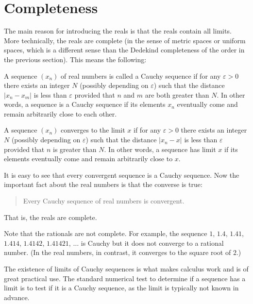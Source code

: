 \documentclass{article}
\begin{document}
\section{Completeness}

The main reason for introducing the reals is that the reals contain all limits.
More technically, the reals are complete (in the sense of metric spaces or
uniform spaces, which is a different sense than the Dedekind completeness of
the order in the previous section). This means the following:
                                                                                
A sequence $(x_n)$ of real numbers is called a Cauchy sequence if for any
$\varepsilon > 0$
there exists an integer $N$ (possibly depending on $\varepsilon$) such that the
distance $|x_n - x_m|$ is less than $\varepsilon$ provided that $n$ and $m$ are
both greater than $N$. In other
words, a sequence is a Cauchy sequence if its elements $x_n$ eventually come
and remain arbitrarily close to each other.
                                                                                
A sequence $(x_n)$ converges to the limit $x$ if for any $\varepsilon > 0$
there exists an integer $N$ (possibly depending on $\varepsilon$) such that the
distance $|x_n - x|$ is less than $\varepsilon$ provided that $n$ is greater
than $N$. In other words, a sequence has limit $x$ if its elements eventually
come and remain arbitrarily close to $x$.
                                                                                
It is easy to see that every convergent sequence is a Cauchy sequence. Now the
important fact about the real numbers is that the converse is true:
\begin{quotation}
    Every Cauchy sequence of real numbers is convergent.
\end{quotation}
That is, the reals are complete.
                                                                                
Note that the rationals are not complete. For example, the sequence $1$, $1.4$,
$1.41$, $1.414$, $1.4142$, $1.41421$, $\ldots$ is Cauchy but it does not
converge to a rational number. (In the real numbers, in contrast, it converges
to the square root of $2$.)
                                                                                
The existence of limits of Cauchy sequences is what makes calculus work and is
of great practical use. The standard numerical test to determine if a sequence
has a limit is to test if it is a Cauchy sequence, as the limit is typically
not known in advance.
                                                                                
\end{document}

